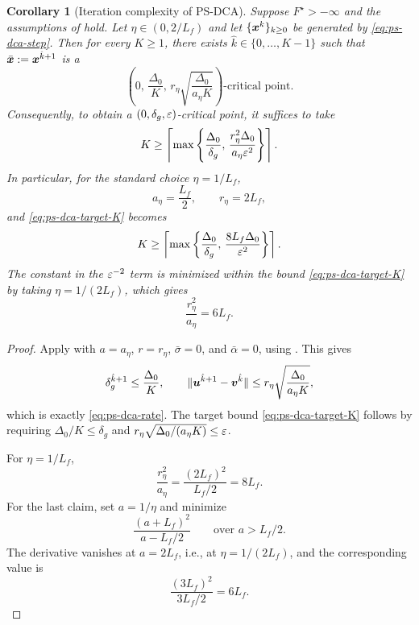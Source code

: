 \documentclass[english]{article}
\newtheorem{corollary}{Corollary}[section]
\begin{document}
\begin{corollary}[Iteration complexity of PS-DCA]
\label{cor:ps-dca-complexity}
Suppose $F^\star>-\infty$ and the assumptions of
 hold. Let
$\eta\in(0,2/L_f)$ and let $\{\bm{x}^k\}_{k\ge0}$ be generated by
\eqref{eq:ps-dca-step}. Then for every $K\ge1$, there exists
$\hat k\in\{0,\ldots,K-1\}$ such that
$\bar{\bm{x}}:=\bm{x}^{\hat k+1}$ is a
\begin{equation}
    \left(
        0,\,
        \frac{\Delta_0}{K},\,
        r_\eta
        \sqrt{
            \frac{\Delta_0}{a_\eta K}
        }
    \right)\text{-critical point}.
    \label{eq:ps-dca-rate}
\end{equation}
Consequently, to obtain a $(0,\delta_g,\varepsilon)$-critical point, it
suffices to take
\begin{equation}
    K
    \ge
    \left\lceil
    \max\left\{
        \frac{\Delta_0}{\delta_g},\,
        \frac{r_\eta^2\Delta_0}{a_\eta\varepsilon^2}
    \right\}
    \right\rceil .
    \label{eq:ps-dca-target-K}
\end{equation}
In particular, for the standard choice $\eta=1/L_f$,
\[
    a_\eta=\frac{L_f}{2},
    \qquad
    r_\eta=2L_f,
\]
and \eqref{eq:ps-dca-target-K} becomes
\begin{equation}
    K
    \ge
    \left\lceil
    \max\left\{
        \frac{\Delta_0}{\delta_g},\,
        \frac{8L_f\Delta_0}{\varepsilon^2}
    \right\}
    \right\rceil .
    \label{eq:ps-dca-standard-stepsize-K}
\end{equation}
The constant in the $\varepsilon^{-2}$ term is minimized within the bound
\eqref{eq:ps-dca-target-K} by taking $\eta=1/(2L_f)$, which gives
\[
    \frac{r_\eta^2}{a_\eta}=6L_f .
\]
\end{corollary}

\begin{proof}
Apply  with
$a=a_\eta$, $r=r_\eta$, $\bar\sigma=0$, and $\bar\alpha=0$, using
. This gives
\[
    \delta_g^{\hat k+1}\le\frac{\Delta_0}{K},
    \qquad
    \|\bm{u}^{\hat k+1}-\bm{v}^{\hat k}\|
    \le
    r_\eta
    \sqrt{\frac{\Delta_0}{a_\eta K}},
\]
which is exactly \eqref{eq:ps-dca-rate}. The target bound
\eqref{eq:ps-dca-target-K} follows by requiring
$\Delta_0/K\le\delta_g$ and
$r_\eta\sqrt{\Delta_0/(a_\eta K)}\le\varepsilon$.

For $\eta=1/L_f$,
\[
    \frac{r_\eta^2}{a_\eta}
    =
    \frac{(2L_f)^2}{L_f/2}
    =
    8L_f.
\]
For the last claim, set $a=1/\eta$ and minimize
\[
    \frac{(a+L_f)^2}{a-L_f/2}
    \qquad
    \text{over }a>L_f/2.
\]
The derivative vanishes at $a=2L_f$, i.e., at
$\eta=1/(2L_f)$, and the corresponding value is
\[
    \frac{(3L_f)^2}{3L_f/2}=6L_f.
\]
\end{proof}
\end{document}
